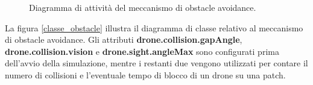 \begin{figure}[H] 
    \captionsetup{justification=centering, margin=2cm, font=footnotesize}
    \begin{center}
    \end{center}
    \caption{Diagramma di attività del meccanismo di obstacle avoidance.}
    \label{activity_obstacle}
\end{figure}

La figura \ref{classe_obstacle} illustra il diagramma di classe relativo al meccanismo di obstacle avoidance.
Gli attributi \textbf{drone.collision.gapAngle}, \textbf{drone.collision.vision} e \textbf{drone.sight.angleMax} sono configurati prima dell'avvio della simulazione, mentre i restanti due vengono utilizzati per contare il numero di collisioni e l'eventuale tempo di blocco di un drone su una patch.

